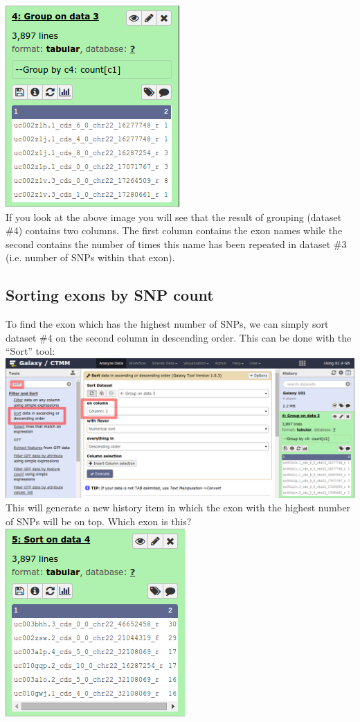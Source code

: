 \documentclass[11pt,a4paper]{article}
\begin{document}
\includegraphics[scale=0.65]{figures/101_14}\\
If you look at the above image you will see that the result of grouping (dataset \#4) contains two columns. The first column contains the exon names while the second contains the number of times this name has been repeated in dataset \#3 (i.e. number of SNPs within that exon).
\subsection{Sorting exons by SNP count}
To find the exon which has the highest number of SNPs, we can simply sort dataset \#4 on the second column in descending order. This can be done with the ``Sort'' tool:\\

\includegraphics[width=\textwidth]{figures/101_15}\\
This will generate a new history item in which the exon with the highest number of SNPs will be on top. Which exon is this? \\

\includegraphics[scale=0.65]{figures/101_16}\\
\end{document}
